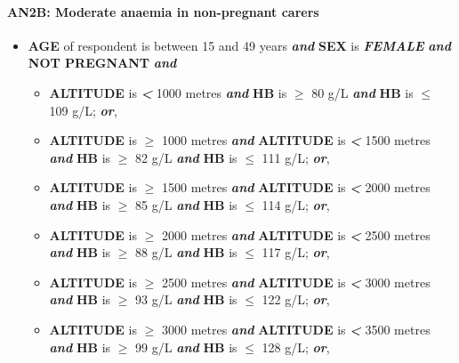 \documentclass[12pt,a4paper]{article}
\let\oldparagraph\paragraph
\renewcommand{\paragraph}[1]{\oldparagraph{#1}\mbox{}}
\begin{document}
\newpage

\hypertarget{an2b-moderate-anaemia-in-non-pregnant-carers}{%
\paragraph{AN2B: Moderate anaemia in non-pregnant carers}\label{an2b-moderate-anaemia-in-non-pregnant-carers}}

\begin{itemize}
\item
  \textbf{AGE} of respondent is between 15 and 49 years \textbf{\emph{and}} \textbf{SEX} is \textbf{\emph{FEMALE}} \textbf{\emph{and}} \textbf{NOT PREGNANT} \textbf{\emph{and}}

  \begin{itemize}
  \item
    \textbf{ALTITUDE} is \textbf{\emph{\textless{}}} 1000 metres \textbf{\emph{and}} \textbf{HB} is \textbf{\emph{\(\geq\)}} 80 g/L \textbf{\emph{and}} \textbf{HB} is \textbf{\emph{\(\leq\)}} 109 g/L; \textbf{\emph{or}},
  \item
    \textbf{ALTITUDE} is \textbf{\emph{\(\geq\)}} 1000 metres \textbf{\emph{and}} \textbf{ALTITUDE} is \textbf{\emph{\textless{}}} 1500 metres \textbf{\emph{and}} \textbf{HB} is \textbf{\emph{\(\geq\)}} 82 g/L \textbf{\emph{and}} \textbf{HB} is \textbf{\emph{\(\leq\)}} 111 g/L; \textbf{\emph{or}},
  \item
    \textbf{ALTITUDE} is \textbf{\emph{\(\geq\)}} 1500 metres \textbf{\emph{and}} \textbf{ALTITUDE} is \textbf{\emph{\textless{}}} 2000 metres \textbf{\emph{and}} \textbf{HB} is \textbf{\emph{\(\geq\)}} 85 g/L \textbf{\emph{and}} \textbf{HB} is \textbf{\emph{\(\leq\)}} 114 g/L; \textbf{\emph{or}},
  \item
    \textbf{ALTITUDE} is \textbf{\emph{\(\geq\)}} 2000 metres \textbf{\emph{and}} \textbf{ALTITUDE} is \textbf{\emph{\textless{}}} 2500 metres \textbf{\emph{and}} \textbf{HB} is \textbf{\emph{\(\geq\)}} 88 g/L \textbf{\emph{and}} \textbf{HB} is \textbf{\emph{\(\leq\)}} 117 g/L; \textbf{\emph{or}},
  \item
    \textbf{ALTITUDE} is \textbf{\emph{\(\geq\)}} 2500 metres \textbf{\emph{and}} \textbf{ALTITUDE} is \textbf{\emph{\textless{}}} 3000 metres \textbf{\emph{and}} \textbf{HB} is \textbf{\emph{\(\geq\)}} 93 g/L \textbf{\emph{and}} \textbf{HB} is \textbf{\emph{\(\leq\)}} 122 g/L; \textbf{\emph{or}},
  \item
    \textbf{ALTITUDE} is \textbf{\emph{\(\geq\)}} 3000 metres \textbf{\emph{and}} \textbf{ALTITUDE} is \textbf{\emph{\textless{}}} 3500 metres \textbf{\emph{and}} \textbf{HB} is \textbf{\emph{\(\geq\)}} 99 g/L \textbf{\emph{and}} \textbf{HB} is \textbf{\emph{\(\leq\)}} 128 g/L; \textbf{\emph{or}},

\end{itemize}
\end{itemize}
\end{document}
